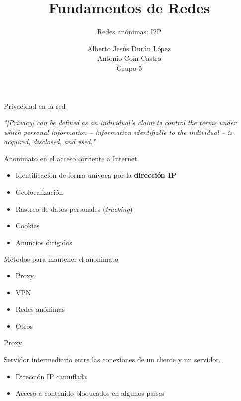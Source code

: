 \documentclass[spanish]{beamer}
\title{Fundamentos de Redes}
\subtitle{Redes anónimas: I2P}
\author{Alberto Jesús Durán López\\ Antonio Coín Castro\\ \vspace{1em}Grupo 5}
\begin{document}
\maketitle



\begin{frame}{Privacidad en la red}
	
	\textit{"[Privacy] can be defined as an individual's claim to control the terms under which personal information -- information identifiable to the individual -- is acquired, disclosed, and used."}
	
	
\end{frame}



\begin{frame}{Anonimato en el acceso corriente a Internet}

\begin{itemize}
	\item Identificación de forma unívoca por la \textbf{dirección IP}
	\item Geolocalización
    \item Rastreo de datos personales (\textit{tracking})\\ 
    \item Cookies
    \item Anuncios dirigidos
\end{itemize}

\end{frame}  



\begin{frame}{Métodos para mantener el anonimato}
	
\begin{itemize}
	\item Proxy \\
	\item VPN\\ 
	\item Redes anónimas\\
	\item Otros
\end{itemize}	
	
\end{frame}



\begin{frame}{Proxy}
	
Servidor intermediario entre las conexiones de un cliente y un servidor. \\

\vspace{2.9em}
\begin{itemize}
	\item Dirección IP camuflada \\
	\item Acceso a contenido bloqueados en algunos países \\ 
\end{itemize}
	
\end{frame}
\end{document}
